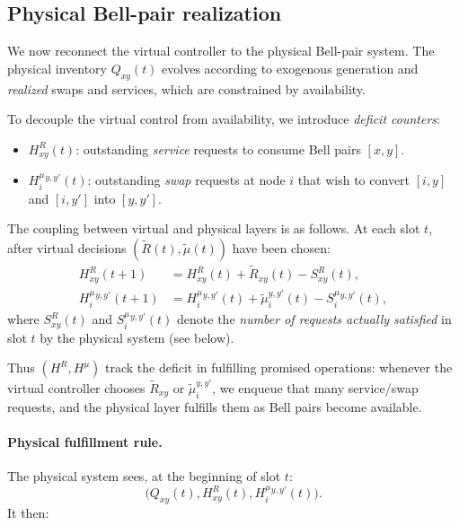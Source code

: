 \documentclass[11pt]{article}
\begin{document}
\subsection{Physical Bell-pair realization}

We now reconnect the virtual controller to the physical Bell-pair system.
The physical inventory $Q_{xy}(t)$ evolves according to exogenous generation and
\emph{realized} swaps and services, which are constrained by availability.

To decouple the virtual control from availability, we introduce \emph{deficit counters}:
\begin{itemize}[leftmargin=2em]
\item $H^R_{xy}(t)$: outstanding \emph{service} requests to consume Bell pairs $[x,y]$.
\item $H^\mu_i{}^{y,y'}(t)$: outstanding \emph{swap} requests at node $i$ that wish to
convert $[i,y]$ and $[i,y']$ into $[y,y']$.
\end{itemize}

The coupling between virtual and physical layers is as follows. At each slot $t$, after virtual decisions $(\tilde R(t),\tilde\mu(t))$ have been chosen:
\begin{align}
H^R_{xy}(t{+}1)
&= H^R_{xy}(t) + \tilde R_{xy}(t) - S^R_{xy}(t),
\label{eq:HR-update}\\
H^\mu_i{}^{y,y'}(t{+}1)
&= H^\mu_i{}^{y,y'}(t) + \tilde\mu_i^{y,y'}(t) - S^\mu_i{}^{y,y'}(t),
\label{eq:Hmu-update}
\end{align}
where $S^R_{xy}(t)$ and $S^\mu_i{}^{y,y'}(t)$ denote the \emph{number of requests actually
satisfied} in slot $t$ by the physical system (see below).

Thus $(H^R,H^\mu)$ track the deficit in fulfilling  promised operations:
whenever the virtual controller chooses $\tilde R_{xy}$ or $\tilde\mu_i^{y,y'}$, we enqueue
that many service/swap requests, and the physical layer fulfills them as Bell pairs become available.

\paragraph{Physical fulfillment rule.}
The physical system sees, at the beginning of slot $t$:
\[
\bigl(Q_{xy}(t), H^R_{xy}(t), H^\mu_i{}^{y,y'}(t)\bigr).
\]
It then:
\end{document}
